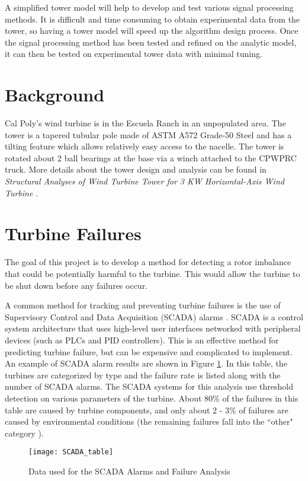 A simplified tower model will help to develop and test various signal processing methods.  It is difficult and time consuming to obtain experimental data from the tower, so having a tower model will speed up the algorithm design process.  Once the signal processing method has been tested and refined on the analytic model, it can then be tested on experimental tower data with minimal tuning.

\section{Background}
Cal Poly’s wind turbine is in the Escuela Ranch in an unpopulated area.  The tower is a tapered tubular pole made of ASTM A572 Grade-50 Steel and has a tilting feature which allows relatively easy access to the nacelle.  The tower is rotated about 2 ball bearings at the base via a winch attached to the CPWPRC truck.  More details about the tower design and analysis can be found in \textit{Structural Analyses of Wind Turbine Tower for 3 KW Horizontal-Axis Wind Turbine} \cite{Gwon_paper}.

\section{Turbine Failures}
The goal of this project is to develop a method for detecting a rotor imbalance that could be potentially harmful to the turbine.  This would allow the turbine to be shut down before any failures occur.  

A common method for tracking and preventing turbine failures is the use of Supervisory Control and Data Acquisition (SCADA) alarms \cite{WT_failures_paper}.  SCADA is a control system architecture that uses high-level user interfaces networked with peripheral devices (such as PLCs and PID controllers).  This is an effective method for predicting turbine failure, but can be expensive and complicated to implement.  An example of SCADA alarm results are shown in Figure \ref{fig:SCADA_table}.  In this table, the turbines are categorized by type and the failure rate is listed along with the number of SCADA alarms.  The SCADA systems for this analysis use threshold detection on various parameters of the turbine.  About 80\% of the failures in this table are caused by turbine components, and only about 2 - 3\% of failures are caused by environmental conditions (the remaining failures fall into the ``other" category \cite{wind_turbine_failures}).

\begin{figure}
	\centering
	\texttt{[image: SCADA\_table]}
	\decoRule
	\caption{Data used for the SCADA Alarms and Failure Analysis \cite{wind_turbine_failures}}
	\label{fig:SCADA_table}
\end{figure}

